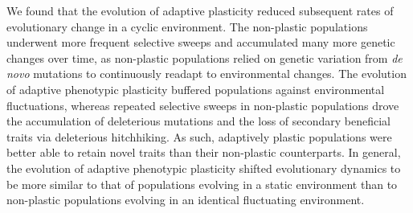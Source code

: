 We found that the evolution of adaptive plasticity reduced subsequent rates of evolutionary change in a cyclic environment.
The non-plastic populations underwent more frequent selective sweeps and accumulated many more genetic changes over time, as non-plastic populations relied on genetic variation from \textit{de novo} mutations to continuously readapt to environmental changes. 
The evolution of adaptive phenotypic plasticity buffered populations against environmental fluctuations, whereas repeated selective sweeps in non-plastic populations drove the accumulation of deleterious mutations and the loss of secondary beneficial traits via deleterious hitchhiking.
As such, adaptively plastic populations were better able to retain novel traits than their non-plastic counterparts.
In general, the evolution of adaptive phenotypic plasticity shifted evolutionary dynamics to be more similar to that of populations evolving in a static environment than to non-plastic populations evolving in an identical fluctuating environment. 

